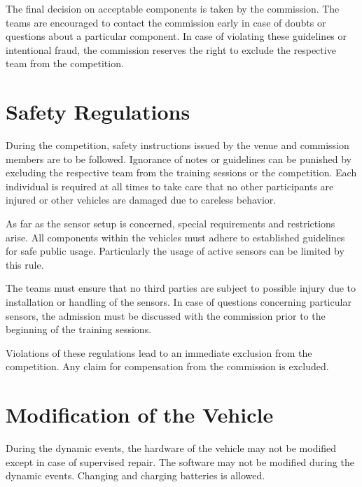 The final decision on acceptable components is taken by the commission. The
teams are encouraged to contact the commission early in case of doubts or
questions about a particular component. In case of violating these guidelines
or intentional fraud, the commission reserves the right to exclude the
respective team from the competition.

\section{Safety Regulations}

During the competition, safety instructions issued by the venue and commission
members are to be followed. Ignorance of notes or guidelines can be punished by
excluding the respective team from the training sessions or the competition.
Each individual is required at all times to take care that no other
participants are injured or other vehicles are damaged due to careless
behavior.

As far as the sensor setup is concerned, special requirements and restrictions
arise. All components within the vehicles must adhere to established guidelines
for safe public usage. Particularly the usage of active sensors can be limited
by this rule.

The teams must ensure that no third parties are subject to possible injury due
to installation or handling of the sensors. In case of questions concerning
particular sensors, the admission must be discussed with the commission prior
to the beginning of the training sessions.

Violations of these regulations lead to an immediate exclusion from the
competition. Any claim for compensation from the commission is excluded.

\section{Modification of the Vehicle}

During the dynamic events, the hardware of the vehicle may not be modified
except in case of supervised repair. The software may not be modified during
the dynamic events. Changing and charging batteries is allowed.